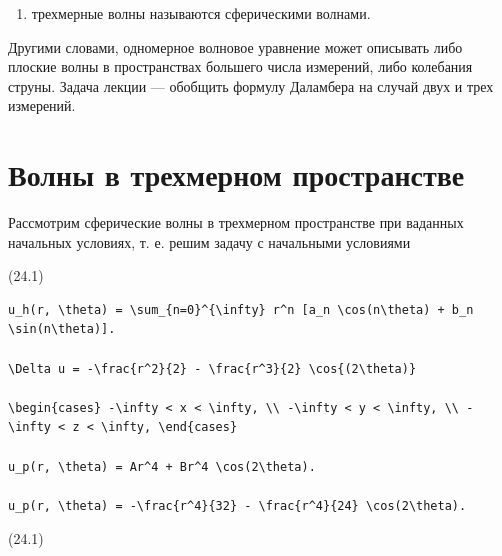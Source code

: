 \documentclass[
  ukrainian,
]{article}
\providecommand{\tightlist}{%
  \setlength{\itemsep}{0pt}\setlength{\parskip}{0pt}}
\begin{document}
\begin{enumerate}
\def\labelenumi{\arabic{enumi})}
\setcounter{enumi}{2}
\tightlist
\item
  трехмерные волны называются сферическими волнами.
\end{enumerate}

Другими словами, одномерное волновое уравнение может описывать либо
плоские волны в пространствах большего числа измерений, либо колебания
струны. Задача лекции --- обобщить формулу Даламбера на случай двух и
трех измерений.

\section{Волны в трехмерном
пространстве}\label{ux432ux43eux43bux43dux44b-ux432-ux442ux440ux435ux445ux43cux435ux440ux43dux43eux43c-ux43fux440ux43eux441ux442ux440ux430ux43dux441ux442ux432ux435}

Рассмотрим сферические волны в трехмерном пространстве при ваданных
начальных условиях, т. е. решим задачу с начальными условиями

(24.1)

\begin{verbatim}
u_h(r, \theta) = \sum_{n=0}^{\infty} r^n [a_n \cos(n\theta) + b_n \sin(n\theta)].

\Delta u = -\frac{r^2}{2} - \frac{r^3}{2} \cos{(2\theta)}

\begin{cases} -\infty < x < \infty, \\ -\infty < y < \infty, \\ -\infty < z < \infty, \end{cases}

u_p(r, \theta) = Ar^4 + Br^4 \cos(2\theta).

u_p(r, \theta) = -\frac{r^4}{32} - \frac{r^4}{24} \cos(2\theta).
\end{verbatim}

(24.1)
\end{document}
